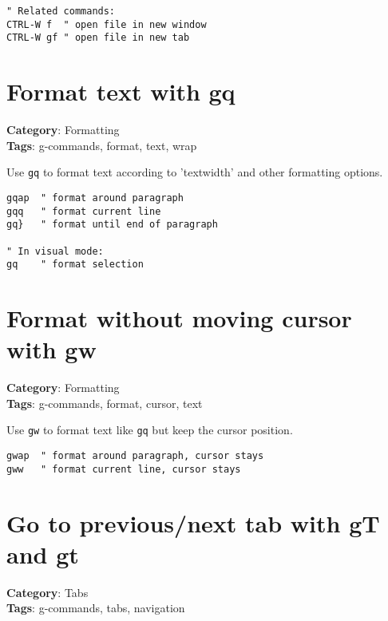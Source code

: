 {{{{{{\begin{Exa*}{}
\begin{Verbatim}[fontsize=\footnotesize, breaklines, breakanywhere]
" Related commands:
CTRL-W f  " open file in new window
CTRL-W gf " open file in new tab
\end{Verbatim}
\end{Exa*}

\section{Format text with gq}

\textbf{Category}: Formatting\\ \textbf{Tags}: g-commands, format, text, wrap
\vspace{0.5cm}

Use {\footnotesize \Verb§gq§} to format text according to 'textwidth' and other formatting options.

\begin{Exa*}{}
\begin{Verbatim}[fontsize=\footnotesize, breaklines, breakanywhere]
gqap  " format around paragraph
gqq   " format current line
gq}   " format until end of paragraph

" In visual mode:
gq    " format selection
\end{Verbatim}
\end{Exa*}

\section{Format without moving cursor with gw}

\textbf{Category}: Formatting\\ \textbf{Tags}: g-commands, format, cursor, text
\vspace{0.5cm}

Use {\footnotesize \Verb§gw§} to format text like {\footnotesize \Verb§gq§} but keep the cursor position.

\begin{Exa*}{}
\begin{Verbatim}[fontsize=\footnotesize, breaklines, breakanywhere]
gwap  " format around paragraph, cursor stays
gww   " format current line, cursor stays
\end{Verbatim}
\end{Exa*}

\section{Go to previous/next tab with gT and gt}

\textbf{Category}: Tabs\\ \textbf{Tags}: g-commands, tabs, navigation
\vspace{0.5cm}

}}}}}}
